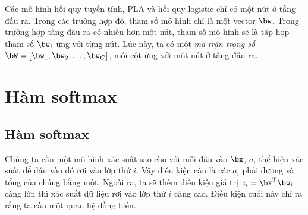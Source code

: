  

 
Các mô hình hồi quy tuyến tính, PLA và hồi quy logistic chỉ có một nút ở tầng
đầu ra. Trong các trường hợp đó, tham số mô hình chỉ là một vector $\bw$.
Trong trường hợp tầng đầu ra có nhiều hơn một nút, tham số mô hình sẽ là tập hợp
tham số $\bw_i$ ứng với từng nút. Lúc này, ta có một \textit{ma trận
trọng số} $\bW = [\bw_1, \bw_2, \dots, \bw_C]$, mỗi
cột ứng với một nút ở tầng đầu ra.
 
 
\section{Hàm softmax}
\subsection{Hàm softmax}

Chúng ta cần một mô hình xác suất sao cho với mỗi đầu vào $\bx$, $a_i$ thể hiện
xác suất để đầu vào đó rơi vào lớp thứ $i$. Vậy điều kiện cần là các $a_i$ phải
dương và tổng của chúng bằng một. Ngoài ra, ta sẽ thêm điều kiện giá trị $z_i =
\bx^T\bw_i$ càng lớn thì xác suất dữ liệu rơi vào lớp thứ $i$ càng cao. Điều
kiện cuối này chỉ ra rằng ta cần một quan hệ đồng biến.
 
